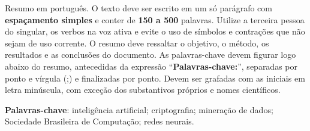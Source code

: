 
\begin{resumo}
  \begin{SingleSpace}
    Resumo em português. O texto deve ser escrito em um só parágrafo com \textbf{espaçamento simples} e conter de \textbf{150 a 500} palavras. Utilize a terceira pessoa do singular, os verbos na voz ativa e evite o uso de símbolos e contrações que não sejam de uso corrente. O resumo deve ressaltar o  objetivo, o método, os resultados e as conclusões do documento. As palavras-chave devem figurar logo abaixo do resumo, antecedidas da expressão ``\textbf{Palavras-chave:}'', separadas por ponto e vírgula (;) e finalizadas por ponto. Devem ser grafadas com as iniciais em letra minúscula, com exceção dos substantivos próprios e nomes científicos.
  \end{SingleSpace}

  \vspace{\onelineskip}
  \textbf{Palavras-chave}: inteligência artificial; criptografia; mineração de dados; Sociedade Brasileira de Computação; redes neurais.
\end{resumo}
